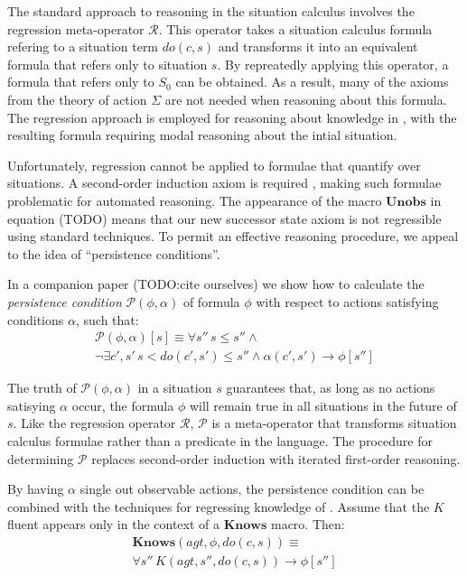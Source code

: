 \documentclass[letterpaper]{article}
\begin{document}
The standard approach to reasoning in the situation calculus \cite{reiter91frameprob}
involves the regression meta-operator $\mathcal{R}$. This operator
takes a situation calculus formula refering to a situation term $do(c,s)$
and transforms it into an equivalent formula that refers only to situation
$s$. By repreatedly applying this operator, a formula that refers
only to $S_{0}$ can be obtained. As a result, many of the axioms
from the theory of action $\Sigma$ are not needed when reasoning
about this formula. The regression approach is employed for reasoning
about knowledge in \cite{scherl03sc_knowledge}, with the resulting
formula requiring modal reasoning about the intial situation.

Unfortunately, regression cannot be applied to formulae that quantify
over situations. A second-order induction axiom is required \cite{Reiter93proving},
making such formulae problematic for automated reasoning. The appearance
of the macro $\mathbf{Unobs}$ in equation (TODO) means that our new
successor state axiom is not regressible using standard techniques.
To permit an effective reasoning procedure, we appeal to the idea
of {}``persistence conditions''.

In a companion paper (TODO:cite ourselves) we show how to calculate
the \emph{persistence condition} $\mathcal{P}(\phi,\alpha)$ of formula
$\phi$ with respect to actions satisfying conditions $\alpha$, such
that:
\begin{multline}
\mathcal{P}(\phi,\alpha)[s]\equiv\forall s''\, s\leq s''\wedge\\
\neg\exists c',s'\, s<do(c',s')\leq s''\wedge\alpha(c',s')\rightarrow\phi[s'']
\end{multline}


The truth of $\mathcal{P}(\phi,\alpha)$ in a situation $s$ guarantees
that, as long as no actions satisying $\alpha$ occur, the formula
$\phi$ will remain true in all situations in the future of $s$.
Like the regression operator $\mathcal{R}$, $\mathcal{P}$ is a meta-operator
that transforms situation calculus formulae rather than a predicate
in the language. The procedure for determining $\mathcal{P}$ replaces
second-order induction with iterated first-order reasoning.

By having $\alpha$ single out observable actions, the persistence
condition can be combined with the techniques for regressing knowledge
of \cite{scherl03sc_knowledge}. Assume that the $K$ fluent appears
only in the context of a $\mathbf{Knows}$ macro. Then:
\begin{multline}
\mathbf{Knows}(agt,\phi,do(c,s))\equiv\\
\forall s''\, K(agt,s'',do(c,s))\rightarrow\phi[s'']
\end{multline}
\end{document}
